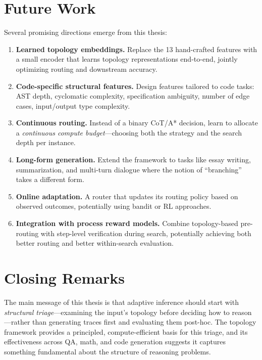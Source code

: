 \section{Future Work}

Several promising directions emerge from this thesis:

\begin{enumerate}
\item \textbf{Learned topology embeddings.} Replace the 13 hand-crafted features with a small encoder that learns topology representations end-to-end, jointly optimizing routing and downstream accuracy.

\item \textbf{Code-specific structural features.} Design features tailored to code tasks: AST depth, cyclomatic complexity, specification ambiguity, number of edge cases, input/output type complexity.

\item \textbf{Continuous routing.} Instead of a binary CoT/A* decision, learn to allocate a \emph{continuous compute budget}---choosing both the strategy and the search depth per instance.

\item \textbf{Long-form generation.} Extend the framework to tasks like essay writing, summarization, and multi-turn dialogue where the notion of ``branching'' takes a different form.

\item \textbf{Online adaptation.} A router that updates its routing policy based on observed outcomes, potentially using bandit or RL approaches.

\item \textbf{Integration with process reward models.} Combine topology-based pre-routing with step-level verification during search, potentially achieving both better routing and better within-search evaluation.
\end{enumerate}

\section{Closing Remarks}

The main message of this thesis is that adaptive inference should start with \emph{structural triage}---examining the input's topology before deciding how to reason---rather than generating traces first and evaluating them post-hoc. The topology framework provides a principled, compute-efficient basis for this triage, and its effectiveness across QA, math, and code generation suggests it captures something fundamental about the structure of reasoning problems.
